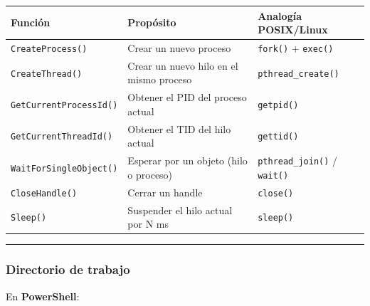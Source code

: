 \documentclass[
  spanish,
]{article}
\newenvironment{Shaded}{}{}
\newcommand{\FunctionTok}[1]{\textcolor[rgb]{0.02,0.16,0.49}{#1}}
\newcommand{\NormalTok}[1]{#1}
\newcommand{\OperatorTok}[1]{\textcolor[rgb]{0.40,0.40,0.40}{#1}}
\newcommand{\VariableTok}[1]{\textcolor[rgb]{0.10,0.09,0.49}{#1}}
\newcounter{none} %
\begin{document}
{\def\LTcaptype{none} %
\begin{longtable}[]{@{}
  >{\raggedright\arraybackslash}p{}
  >{\raggedright\arraybackslash}p{}
  >{\raggedright\arraybackslash}p{}@{}}
\toprule\noalign{}
\begin{minipage}[b]{\linewidth}\raggedright
Función
\end{minipage} & \begin{minipage}[b]{\linewidth}\raggedright
Propósito
\end{minipage} & \begin{minipage}[b]{\linewidth}\raggedright
Analogía POSIX/Linux
\end{minipage} \\
\midrule\noalign{}
\endhead
\bottomrule\noalign{}
\endlastfoot
\texttt{CreateProcess()} & Crear un nuevo proceso & \texttt{fork()} +
\texttt{exec()} \\
\texttt{CreateThread()} & Crear un nuevo hilo en el mismo proceso &
\texttt{pthread\_create()} \\
\texttt{GetCurrentProcessId()} & Obtener el PID del proceso actual &
\texttt{getpid()} \\
\texttt{GetCurrentThreadId()} & Obtener el TID del hilo actual &
\texttt{gettid()} \\
\texttt{WaitForSingleObject()} & Esperar por un objeto (hilo o proceso)
& \texttt{pthread\_join()} / \texttt{wait()} \\
\texttt{CloseHandle()} & Cerrar un handle & \texttt{close()} \\
\texttt{Sleep()} & Suspender el hilo actual por N ms &
\texttt{sleep()} \\
\end{longtable}
}

\begin{center}\rule{0.5\linewidth}{0.5pt}\end{center}

\subsubsection{Directorio de trabajo}\label{directorio-de-trabajo}

En \textbf{PowerShell}:

\begin{Shaded}
\end{Shaded}
\end{document}
